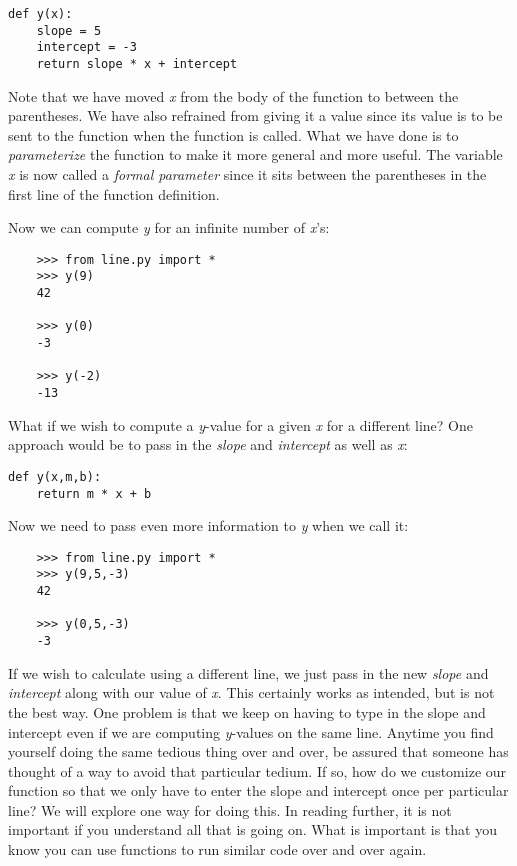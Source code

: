 \begin{verbatim}
def y(x):
    slope = 5
    intercept = -3
    return slope * x + intercept
\end{verbatim}

Note that we have moved {\it x} from the body of the function
to between the parentheses. We have also refrained from
giving it a value since its value is to be sent to the function
when the function is called.
What we have done is to {\it parameterize} the function to make it more
general and more useful. The variable {\it x} is now called a
{\it formal parameter} since it sits between the parentheses in
the first line of the function definition.

Now we can compute {\it y} for an infinite number of {\it x}'s:

\begin{verbatim}
    >>> from line.py import *
    >>> y(9)
    42
    
    >>> y(0)
    -3
    
    >>> y(-2)
    -13
\end{verbatim}

What if we wish to
compute a {\it y}-value for a given {\it x} for a different
line? One approach would be to pass in the {\it slope} and {\it intercept}
as well as {\it x}:

\begin{verbatim}
def y(x,m,b):
    return m * x + b
\end{verbatim}

Now we need to pass even more information to {\it y} when we call it:
    
\begin{verbatim}
    >>> from line.py import *
    >>> y(9,5,-3)
    42
     
    >>> y(0,5,-3)
    -3
\end{verbatim}

If we wish to calculate using a different line, we just pass in the
new {\it slope} and {\it intercept} along with our value of {\it x}.
This certainly works as intended, but is not the best way. One problem
is that we keep on having to type in the slope and intercept even if
we are computing {\it y}-values on the same line. Anytime you
find yourself doing the same tedious thing over and over,
be assured that
someone has thought of a way to avoid that particular tedium.
If so, how do we
customize our function so that we only have to enter the slope
and intercept once per particular line? We will explore
one way for doing this. In reading further,
it is not important if you understand all that is going on.
What is important is that you know you can use functions
to run similar code over and over again.

